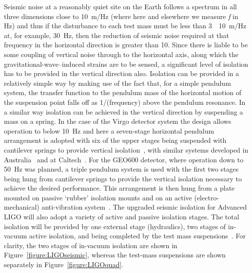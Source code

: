Seismic noise at a reasonably quiet site on the Earth follows a
spectrum in all three dimensions close to 10~m/Hz (where here and elsewhere we measure
\textit{f} in Hz) and thus if the disturbance to each test mass must
be less than 3~\texttimes~10~m/Hz at, for
example, 30~Hz, then the reduction of seismic noise required at that
frequency in the horizontal direction is greater than
10. Since there is liable to be some coupling of vertical
noise through to the horizontal axis, along which the gravitational-wave--induced strains are to be sensed, a significant level of
isolation has to be provided in the vertical direction also. Isolation
can be provided in a relatively simple way by making use of the fact
that, for a simple pendulum system, the transfer function to the
pendulum mass of the horizontal motion of the suspension point falls
off as 1/(frequency) above the pendulum resonance. In a
similar way isolation can be achieved in the vertical direction by
suspending a mass on a spring. In the case of the Virgo detector
system the design allows operation to below 10~Hz and here a
seven-stage horizontal pendulum arrangement is adopted with six of the
upper stages being suspended with cantilever springs to provide vertical
isolation~\cite{Braccini}, with similar systems developed in
Australia~\cite{Ju1} and at Caltech~\cite{DeSalvo}. For the GEO600
detector, where operation down to 50~Hz was planned, a triple pendulum
system is used with the first two stages being hung from cantilever
springs to provide the vertical isolation necessary to achieve the
desired performance. This arrangement is then hung from a plate
mounted on passive `rubber' isolation mounts and on an active
(electro-mechanical) anti-vibration system~\cite{Plissi1, Torrie}. The
upgraded seismic isolation for Advanced LIGO will also adopt a
variety of active and passive isolation stages. The total isolation
will be provided by one external stage (hydraulics), two stages of
in-vacuum active isolation, and being completed by the test mass
suspensions~\cite{Abbott:2002, Harry:2010}. For clarity, the two
stages of in-vacuum isolation are shown in
Figure~\ref{figure:LIGOseismic}, whereas the test-mass suspensions are
shown separately in Figure~\ref{figure:LIGOquad}.